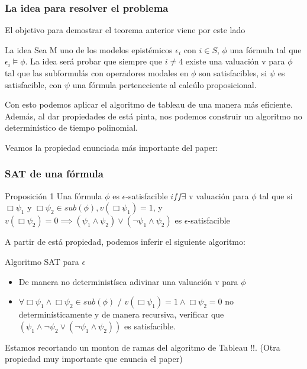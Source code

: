 \documentclass{beamer}
\begin{document}
\begin{frame}
\frametitle{La idea para resolver el problema}

El objetivo para demostrar el teorema anterior viene por este lado

\begin{block}{La idea}
Sea M uno de los modelos epist\'emicos $\epsilon_{i}$ con $i \in S$, $\phi$ una f\'ormula tal que $\epsilon_{i} \models \phi$. La idea ser\'a probar que siempre que $i \neq 4$ existe una valuaci\'on v para $\phi$ tal que las subformul\'as con operadores modales en $\phi$ son satisfacibles, si $\psi$ es satisfacible, con $\psi$ una f\'ormula perteneciente al calc\'ulo proposicional.
\end{block}

Con esto podemos aplicar el algoritmo de tableau de una manera m\'as eficiente. Adem\'as, al dar propiedades de est\'a pinta, nos podemos construir un algoritmo no determin\'istico de tiempo polinomial.

Veamos la propiedad enunciada m\'as importante del paper:
\end{frame}

\begin{frame}
\frametitle{SAT de una f\'ormula}

\begin{block}{Proposici\'on 1}
Una f\'ormula $\phi$ es $\epsilon$-satisfacible $iff \exists$ v valuaci\'on para $\phi$ tal que si $\Box\psi_{1}$ y $\Box \psi_{2} \in sub(\phi), v(\Box \psi_{1}) = 1$, y $v(\Box \psi_{2}) = 0 \implies (\psi_{1} \land \psi_{2}) \lor (\neg \psi_{1} \land \psi_{2})$ es $\epsilon$-satisfacible
\end{block}

A partir de est\'a propiedad, podemos inferir el siguiente algoritmo:

\begin{block}{Algoritmo SAT para $\epsilon$}
\begin{itemize}
	\item De manera no determinist\'isca adivinar una valuaci\'on v para $\phi$
	\item $\forall \Box\psi_{1} \land \Box\psi_{2} \in sub(\phi)$ / $v(\Box\psi_{1}) = 1 \land \Box\psi_{2} = 0$ no determin\'isticamente y de manera recursiva, verificar que $(\psi_{1} \land \neg\psi_{2} \lor (\neg\psi_{1}\land\psi_{2}))$ es satisfacible.
\end{itemize}
\end{block}

Estamos recortando un monton de ramas del algoritmo de Tableau !!. (Otra propiedad muy importante que enuncia el paper)

\end{frame}
\end{document}
